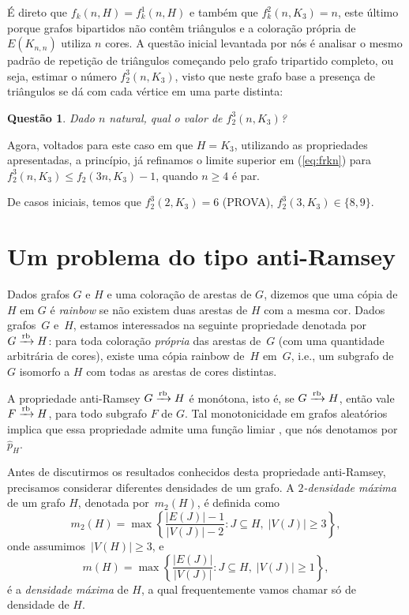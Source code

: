 \documentclass[12pt,a4paper]{book}
\def\rbarrow{\xrightarrow[]{\raisebox{0.0mm}[0mm]{$\scriptstyle \rm rb$}}}
\let\subset\subseteq
\newtheorem{questao}[teorema] {Questão}
\begin{document}
É direto que $f_k(n,H) = f_k^1(n,H)$ e também que $f_k^2(n, K_3)= n$, este último porque grafos bipartidos não contêm triângulos e a coloração própria de $E(K_{n,n})$ utiliza $n$ cores. 
A questão inicial levantada por nós é analisar o mesmo padrão de repetição de triângulos começando pelo grafo tripartido completo, ou seja, estimar o número $f_2^3(n, K_3)$, visto que neste grafo base a presença de triângulos se dá com cada vértice em uma parte distinta:

\begin{questao}\label{q:tripartido}
    Dado $n$ natural, qual o valor de $f_2^3(n, K_3)$?
\end{questao}

Agora, voltados para este caso em que $H=K_3$, utilizando as propriedades apresentadas,
a princípio, já refinamos o limite superior em (\ref{eq:frkn}) para $f_2^3(n,K_3) \leq f_2(3n, K_3)-1$, quando $n \geq 4$ é par.

De casos iniciais, temos que $f_2^3(2, K_3) = 6$ (PROVA), $f_2^3(3,K_3) \in \{8,9\}$.

 

\chapter{Um problema do tipo anti-Ramsey}\label{cap:anti}

Dados grafos $G$ e $H$ e uma coloração de arestas de $G$, dizemos que uma cópia de $H$ em $G$ é \emph{rainbow} se não existem duas arestas de $H$ com a mesma cor.
%
Dados grafos~$G$ e~$H$, estamos interessados na seguinte propriedade denotada por ${G\rbarrow H}$: para toda coloração \textit{própria} das arestas de~$G$ (com uma quantidade arbitrária de cores),
existe uma cópia rainbow de~$H$ em~$G$, i.e., um subgrafo de $G$ isomorfo a $H$ com todas as arestas de cores distintas.


A propriedade anti-Ramsey ${G\rbarrow H}$ é monótona, isto é, se ${G\rbarrow H}$, então vale ${F\rbarrow H}$, para todo subgrafo $F$ de $G$. Tal monotonicidade em 
grafos aleatórios implica que essa propriedade admite uma função limiar \cite{BoTh87}, que nós denotamos por $\hat{p}_H$. 


Antes de discutirmos os resultados conhecidos desta propriedade anti-Ramsey, precisamos considerar diferentes densidades de um grafo. 
A \emph{$2$-densidade máxima} de um grafo $H$, denotada por~$m_2(H)$, é definida como 
\begin{equation*}
  m_2(H)=\max\left\{\frac{|E(J)|-1}{|V(J)|-2}\colon J\subset H,\;|V(J)|\geq3\right\},
\end{equation*}
onde assumimos~$|V(H)|\geq3$, e 
\[
    m(H) = \max\left\{\frac{|E(J)|}{|V(J)|}\colon J\subset H,\;|V(J)|\geq1\right\},
\]
é a \emph{densidade máxima} de $H$, a qual frequentemente vamos chamar só de densidade de $H$.
\end{document}
